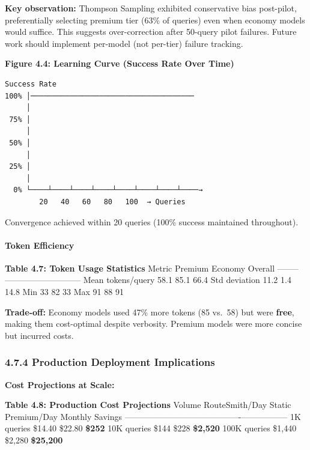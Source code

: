 \documentclass[
]{article}
\begin{document}
\textbf{Key observation:} Thompson Sampling exhibited conservative bias
post-pilot, preferentially selecting premium tier (63\% of queries) even
when economy models would suffice. This suggests over-correction after
50-query pilot failures. Future work should implement per-model (not
per-tier) failure tracking.

\textbf{Figure 4.4: Learning Curve (Success Rate Over Time)}

\begin{verbatim}
Success Rate
100% │──────────────────────────────────────
     │
 75% │
     │
 50% │
     │
 25% │
     │
  0% └────┴────┴────┴────┴────┴────┴────┴────→
        20   40   60   80   100  → Queries
\end{verbatim}

Convergence achieved within 20 queries (100\% success maintained
throughout).

\hypertarget{token-efficiency-1}{%
\paragraph{Token Efficiency}\label{token-efficiency-1}}

\textbf{Table 4.7: Token Usage Statistics} \textbar{} Metric \textbar{}
Premium \textbar{} Economy \textbar{} Overall \textbar{}
\textbar--------\textbar---------\textbar---------\textbar---------\textbar{}
\textbar{} Mean tokens/query \textbar{} 58.1 \textbar{} 85.1 \textbar{}
66.4 \textbar{} \textbar{} Std deviation \textbar{} 11.2 \textbar{} 1.4
\textbar{} 14.8 \textbar{} \textbar{} Min \textbar{} 33 \textbar{} 82
\textbar{} 33 \textbar{} \textbar{} Max \textbar{} 91 \textbar{} 88
\textbar{} 91 \textbar{}

\textbf{Trade-off:} Economy models used 47\% more tokens (85 vs.~58) but
were \textbf{free}, making them cost-optimal despite verbosity. Premium
models were more concise but incurred costs.

\hypertarget{production-deployment-implications-1}{%
\subsubsection{4.7.4 Production Deployment
Implications}\label{production-deployment-implications-1}}

\textbf{Cost Projections at Scale:}

\textbf{Table 4.8: Production Cost Projections} \textbar{} Volume
\textbar{} RouteSmith/Day \textbar{} Static Premium/Day \textbar{}
Monthly Savings \textbar{}
\textbar--------\textbar---------------\textbar-------------------\textbar-----------------\textbar{}
\textbar{} 1K queries \textbar{} \$14.40 \textbar{} \$22.80 \textbar{}
\textbf{\$252} \textbar{} \textbar{} 10K queries \textbar{} \$144
\textbar{} \$228 \textbar{} \textbf{\$2,520} \textbar{} \textbar{} 100K
queries \textbar{} \$1,440 \textbar{} \$2,280 \textbar{}
\textbf{\$25,200} \textbar{}
\end{document}

